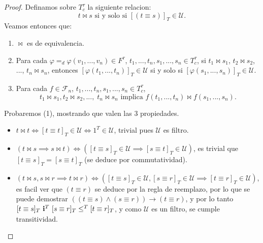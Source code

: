\begin{proof}
\noindent Definamos sobre $T_{c}^{\tau }$ la siguiente relacion:%
\begin{equation*}
t\bowtie s\text{ si y solo si }[(t\equiv s)]_{T}\in \mathcal{U}\text{.}
\end{equation*}%
Veamos entonces que:

\begin{enumerate}
\item $\bowtie$ es de equivalencia.

\item Para cada $\varphi =_{d}\varphi (v_{1},...,v_{n})\in F^{\tau }$, $
t_{1},...,t_{n},s_{1},...,s_{n}\in T_{c}^{\tau }$, si $t_{1}\bowtie s_{1}$, $
t_{2}\bowtie s_{2}$, $...$, $t_{n}\bowtie s_{n}$, entonces $[\varphi
(t_{1},...,t_{n})]_{T}\in \mathcal{U}$ si y solo si $[\varphi
(s_{1},...,s_{n})]_{T}\in \mathcal{U}$.

\item Para cada $f\in \mathcal{F}_{n}$, $
t_{1},...,t_{n},s_{1},...,s_{n}\in T_{c}^{\tau }$,
$$
t_{1}\bowtie s_{1},t_{2}\bowtie s_{2},...,\;t_{n}\bowtie s_{n}\text{ implica 
}f(t_{1},...,t_{n})\bowtie f(s_{1},...,s_{n}).
$$
\end{enumerate}

Probaremos (1), mostrando que valen las 3 propiedades.
\begin{itemize}
  \item $t \bowtie t \iff [t\equiv t]_T \in \mathcal{U} \iff 1^T \in \mathcal{U}$, trivial pues $\mathcal{U}$ es filtro.
  \item $(t \bowtie s \implies s \bowtie t) \iff ([t\equiv s]_T \in \mathcal{U} \implies [s\equiv t]_T \in \mathcal{U})$, es trivial que $[t\equiv s]_T = [s\equiv t]_T$ (se deduce por commutatividad).
  \item $(t\bowtie s, s \bowtie r \implies t\bowtie r) \iff ([t\equiv s]_T \in \mathcal{U}, [s \equiv r]_T \in \mathcal{U} \implies [t \equiv r]_T \in \mathcal{U})$,
  es facil ver que $(t\equiv r)$ se deduce por la regla de reemplazo, por lo que se puede demostrar $((t\equiv s) \land (s\equiv r)) \rightarrow (t\equiv r)$, y por lo tanto
  $[t\equiv s]_T\ \mathbf{i}^T\ [s\equiv r]_T \leq^T [t\equiv r]_T$, y como $\mathcal{U}$ es un filtro, se cumple transitividad.
  
\end{itemize}



\end{proof}
